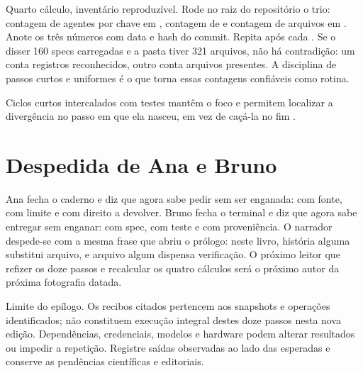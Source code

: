 Quarto c\'alculo, invent\'ario reproduz\'ivel. Rode no raiz do reposit\'orio o trio: contagem de agentes por chave  em , contagem de  e contagem de arquivos em . Anote os tr\^es n\'umeros com data e hash do commit. Repita ap\'os cada . Se o  disser 160 specs carregadas e a pasta tiver 321 arquivos, n\~ao h\'a contradi\c{c}\~ao: um conta registros reconhecidos, outro conta arquivos presentes. A disciplina de passos curtos e uniformes \'e o que torna essas contagens confi\'aveis como rotina.

Ciclos curtos intercalados com testes mant\^em o foco e permitem localizar a diverg\^encia no passo em que ela nasceu, em vez de ca\c{c}\'a-la no fim .

\section{Despedida de Ana e Bruno}

Ana fecha o caderno e diz que agora sabe pedir sem ser enganada: com fonte, com limite e com direito a devolver. Bruno fecha o terminal e diz que agora sabe entregar sem enganar: com spec, com teste e com proveni\^encia. O narrador despede-se com a mesma frase que abriu o pr\'ologo: neste livro, hist\'oria alguma substitui arquivo, e arquivo algum dispensa verifica\c{c}\~ao. O pr\'oximo leitor que refizer os doze passos e recalcular os quatro c\'alculos ser\'a o pr\'oximo autor da pr\'oxima fotografia datada.

\begin{aviso}
Limite do epílogo. Os recibos citados pertencem aos snapshots e operações
identificados; não constituem execução integral destes doze passos nesta
nova edição. Dependências, credenciais, modelos e hardware podem alterar
resultados ou impedir a repetição. Registre saídas observadas ao lado das
esperadas e conserve as pendências científicas e editoriais.
\end{aviso}

